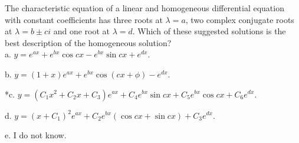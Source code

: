 
The characteristic equation of a linear and homogeneous differential equation with constant coefficients has three roots at \( \lambda = a \), two complex conjugate roots at \( \lambda = b \pm ci \) and one root at \( \lambda = d \). Which of these suggested solutions is the best description of the homogeneous solution? \\


a. \( y = e^{ax} + e^{bx}\cos cx - e^{bx}\sin cx + e^{dx} \).

b. \( y = ( 1 + x )e^{ax} + e^{bx}\cos ( cx + \phi ) - e^{dx} \).

*c. \( y = ( C_{1}x^{2} + C_{2}x + C_{3} )e^{ax} + C_{4}e^{bx}\sin cx + C_{5}e^{bx}\cos cx + C_{6}e^{dx} \).

d. \( y = ( x + C_{1} )^{2}e^{ax} + C_{2}e^{bx} ( \cos cx + \sin cx ) + C_{3}e^{dx} \).

e. I do not know. \\

